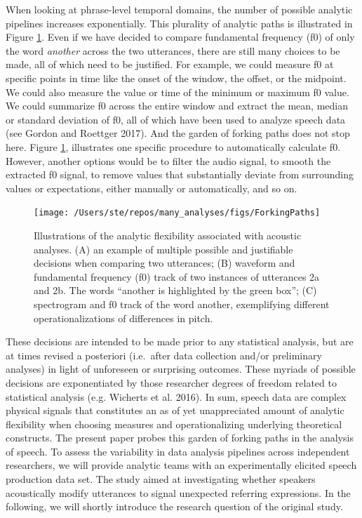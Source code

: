 \documentclass[
  12pt,
]{article}
\begin{document}
When looking at phrase-level temporal domains, the number of possible analytic pipelines increases exponentially.
This plurality of analytic paths is illustrated in Figure \ref{fig:forkingPaths}.
Even if we have decided to compare fundamental frequency (f0) of only the word \emph{another} across the two utterances, there are still many choices to be made, all of which need to be justified.
For example, we could measure f0 at specific points in time like the onset of the window, the offset, or the midpoint.
We could also measure the value or time of the minimum or maximum f0 value.
We could summarize f0 across the entire window and extract the mean, median or standard deviation of f0, all of which have been used to analyze speech data (see Gordon and Roettger 2017).
And the garden of forking paths does not stop here.
Figure \ref{fig:forkingPaths}, illustrates one specific procedure to automatically calculate f0.
However, another options would be to filter the audio signal, to smooth the extracted f0 signal, to remove values that substantially deviate from surrounding values or expectations, either manually or automatically, and so on.



\begin{figure}
\texttt{[image: /Users/ste/repos/many\_analyses/figs/ForkingPaths]} \caption{Illustrations of the analytic flexibility associated with acoustic analyses. (A) an example of multiple possible and justifiable decisions when comparing two utterances; (B) waveform and fundamental frequency (f0) track of two instances of utterances 2a and 2b. The words ``another is highlighted by the green box''; (C) spectrogram and f0 track of the word another, exemplifying different operationalizations of differences in pitch.}\label{fig:forkingPaths}
\end{figure}

These decisions are intended to be made prior to any statistical analysis, but are at times revised a posteriori (i.e.~after data collection and/or preliminary analyses) in light of unforeseen or surprising outcomes.
These myriads of possible decisions are exponentiated by those researcher degrees of freedom related to statistical analysis (e.g. Wicherts et al. 2016).
In sum, speech data are complex physical signals that constitutes an as of yet unappreciated amount of analytic flexibility when choosing measures and operationalizing underlying theoretical constructs.
The present paper probes this garden of forking paths in the analysis of speech.
To assess the variability in data analysis pipelines across independent researchers, we will provide analytic teams with an experimentally elicited speech production data set.
The study aimed at investigating whether speakers acoustically modify utterances to signal unexpected referring expressions.
In the following, we will shortly introduce the research question of the original study.
\end{document}
